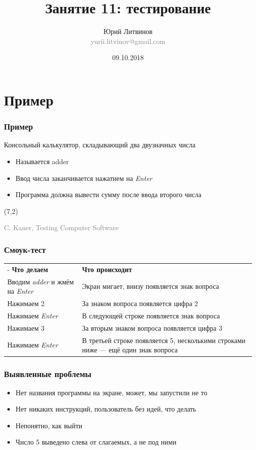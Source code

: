 \documentclass[xetex,mathserif,serif]{beamer}
\title{Занятие 11: тестирование}
\author[Юрий Литвинов]{Юрий Литвинов\\\small{\textcolor{gray}{yurii.litvinov@gmail.com}}}
\date{09.10.2018}
\newcommand{\attribution}[1] {
	\begin{flushright}\begin{scriptsize}\textcolor{gray}{\textcopyright\; #1}\end{scriptsize}\end{flushright}
}
\begin{document}
	\frame{\titlepage}

	\section{Пример}

	\begin{frame}
		\frametitle{Пример}
		Консольный калькулятор, складывающий два двузначных числа
		\begin{itemize}
			\item Называется adder
			\item Ввод числа заканчивается нажатием на \textit{Enter}
			\item Программа должна вывести сумму после ввода второго числа
		\end{itemize}
		\begin{textblock}{5}(7,2)
			\attribution{C. Kaner, Testing Computer Software}
		\end{textblock}
	\end{frame}

	\begin{frame}
		\frametitle{Смоук-тест}
		\begin{center}
			\begin{tabu} {| X[0.6 l p] | X[1 l p] |}
				\tabucline-
				\everyrow{\tabucline-}
				\textbf{Что делаем}                             & \textbf{Что происходит}                                                            \\
				Вводим \textit{adder} и жмём на \textit{Enter}  & Экран мигает, внизу появляется знак вопроса                                        \\
				Нажимаем 2                                      & За знаком вопроса появляется цифра 2                                               \\
				Нажимаем \textit{Enter}                         & В следующей строке появляется знак вопроса                                         \\
				Нажимаем 3                                      & За вторым знаком вопроса появляется цифра 3                                        \\
				Нажимаем \textit{Enter}                         & В третьей строке появляется 5, несколькими строками ниже --- ещё один знак вопроса
			\end{tabu}
		\end{center}
	\end{frame}

	\begin{frame}
		\frametitle{Выявленные проблемы}
		\begin{itemize}
			\item Нет названия программы на экране, может, мы запустили не то
			\item Нет никаких инструкций, пользователь без идей, что делать
			\item Непонятно, как выйти
			\item Число 5 выведено слева от слагаемых, а не под ними
		\end{itemize}
	\end{frame}
\end{document}
